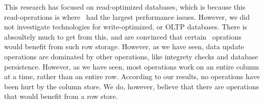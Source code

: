 This research has focused on read-optimized databases, which is because this read-operations is where \gap~had the largest performance issues. However, we did not investigate technologies for write-optimized, or OLTP databases. There is absoultely much to get from this, and are convinced that certain \gap~oprations would benefit from such row storage. However, as we have seen, data update operations are dominated by other operations, like integrety checks and database persistence. However, as we have seen, most operations work on an entire column at a time, rather than an entire row. According to our results, no operations have been hurt by the column store. We do, however, believe that there are operations that would benefit from a row store.

